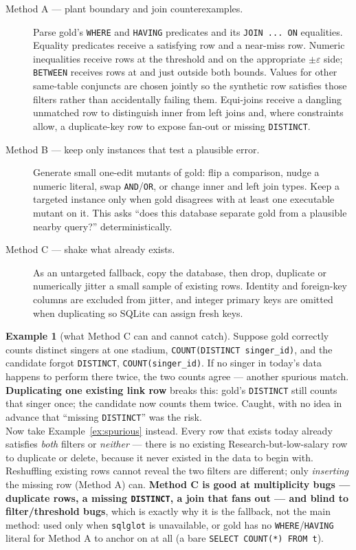 \documentclass[11pt]{article}
\theoremstyle{definition}
\newtheorem{example}[theorem]{Example}
\begin{document}
\begin{description}
\item[Method A --- plant boundary and join counterexamples.] Parse gold's \texttt{WHERE} and \texttt{HAVING} predicates and its \texttt{JOIN ... ON} equalities. Equality predicates receive a satisfying row and a near-miss row. Numeric inequalities receive rows at the threshold and on the appropriate $\pm\varepsilon$ side; \texttt{BETWEEN} receives rows at and just outside both bounds. Values for other same-table conjuncts are chosen jointly so the synthetic row satisfies those filters rather than accidentally failing them. Equi-joins receive a dangling unmatched row to distinguish inner from left joins and, where constraints allow, a duplicate-key row to expose fan-out or missing \texttt{DISTINCT}.
\item[Method B --- keep only instances that test a plausible error.] Generate small one-edit mutants of gold: flip a comparison, nudge a numeric literal, swap \texttt{AND}/\texttt{OR}, or change inner and left join types. Keep a targeted instance only when gold disagrees with at least one executable mutant on it. This asks ``does this database separate gold from a plausible nearby query?'' deterministically.
\item[Method C --- shake what already exists.] As an untargeted fallback, copy the database, then drop, duplicate or numerically jitter a small sample of existing rows. Identity and foreign-key columns are excluded from jitter, and integer primary keys are omitted when duplicating so SQLite can assign fresh keys.
\end{description}

\begin{example}[what Method C can and cannot catch]
Suppose gold correctly counts distinct singers at one stadium, \texttt{COUNT(DISTINCT singer\_id)}, and the candidate forgot \texttt{DISTINCT}, \texttt{COUNT(singer\_id)}. If no singer in today's data happens to perform there twice, the two counts agree --- another spurious match. \textbf{Duplicating one existing link row} breaks this: gold's \texttt{DISTINCT} still counts that singer once; the candidate now counts them twice. Caught, with no idea in advance that ``missing \texttt{DISTINCT}'' was the risk.\\[4pt] Now take Example~\ref{ex:spurious} instead. Every row that exists today already satisfies \emph{both} filters or \emph{neither} --- there is no existing Research-but-low-salary row to duplicate or delete, because it never existed in the data to begin with. Reshuffling existing rows cannot reveal the two filters are different; only \emph{inserting} the missing row (Method A) can. \textbf{Method C is good at multiplicity bugs --- duplicate rows, a missing \texttt{DISTINCT}, a join that fans out --- and blind to filter/threshold bugs}, which is exactly why it is the fallback, not the main method: used only when \texttt{sqlglot} is unavailable, or gold has no \texttt{WHERE}/\texttt{HAVING} literal for Method A to anchor on at all (a bare \texttt{SELECT COUNT(*) FROM t}).
\end{example}
\end{document}
